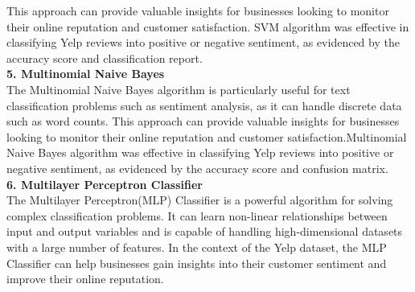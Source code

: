 \documentclass[a4paper, 12pt]{report}
\begin{document}
This approach can provide valuable insights for businesses looking to monitor their online reputation and customer satisfaction. SVM algorithm was effective in classifying Yelp reviews into positive or negative sentiment, as evidenced by the accuracy score and classification report.
\\
\textbf{5. Multinomial Naive Bayes}\\
The Multinomial Naive Bayes algorithm is particularly useful for text classification problems such as sentiment analysis, as it can handle discrete data such as word counts. This approach can provide valuable insights for businesses looking to monitor their online reputation and customer satisfaction.Multinomial Naive Bayes algorithm was effective in classifying Yelp reviews into positive or negative sentiment, as evidenced by the accuracy score and confusion matrix.
\\
\textbf{6. Multilayer Perceptron Classifier}\\
The Multilayer Perceptron(MLP) Classifier is a powerful algorithm for solving complex classification problems. It can learn non-linear relationships between input and output variables and is capable of handling high-dimensional datasets with a large number of features. In the context of the Yelp dataset, the MLP Classifier can help businesses gain insights into their customer sentiment and improve their online reputation.
\pagebreak
\end{document}
